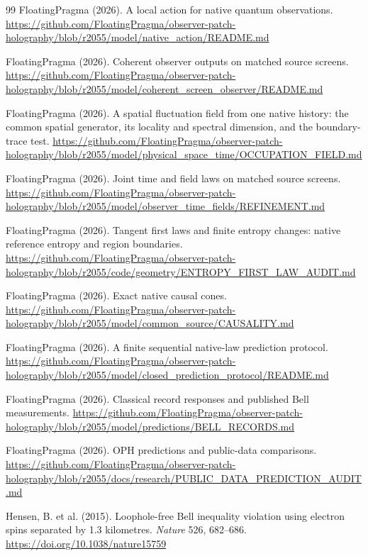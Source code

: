 \documentclass[11pt]{article}
\theoremstyle{definition}
\theoremstyle{remark}
\begin{document}
{\begin{thebibliography}{99}
FloatingPragma (2026). A local action for native quantum observations.
\url{https://github.com/FloatingPragma/observer-patch-holography/blob/r2055/model/native_action/README.md}

FloatingPragma (2026). Coherent observer outputs on matched source screens.
\url{https://github.com/FloatingPragma/observer-patch-holography/blob/r2055/model/coherent_screen_observer/README.md}

FloatingPragma (2026). A spatial fluctuation field from one native history:
the common spatial generator, its locality and spectral dimension, and the
boundary-trace test.
\url{https://github.com/FloatingPragma/observer-patch-holography/blob/r2055/model/physical_space_time/OCCUPATION_FIELD.md}

FloatingPragma (2026). Joint time and field laws on matched source screens.
\url{https://github.com/FloatingPragma/observer-patch-holography/blob/r2055/model/observer_time_fields/REFINEMENT.md}

FloatingPragma (2026). Tangent first laws and finite entropy changes:
native reference entropy and region boundaries.
\url{https://github.com/FloatingPragma/observer-patch-holography/blob/r2055/code/geometry/ENTROPY_FIRST_LAW_AUDIT.md}

FloatingPragma (2026). Exact native causal cones.
\url{https://github.com/FloatingPragma/observer-patch-holography/blob/r2055/model/common_source/CAUSALITY.md}

FloatingPragma (2026). A finite sequential native-law prediction protocol.
\url{https://github.com/FloatingPragma/observer-patch-holography/blob/r2055/model/closed_prediction_protocol/README.md}

FloatingPragma (2026). Classical record responses and published Bell
measurements.
\url{https://github.com/FloatingPragma/observer-patch-holography/blob/r2055/model/predictions/BELL_RECORDS.md}

FloatingPragma (2026). OPH predictions and public-data comparisons.
\url{https://github.com/FloatingPragma/observer-patch-holography/blob/r2055/docs/research/PUBLIC_DATA_PREDICTION_AUDIT.md}

Hensen, B. et al. (2015). Loophole-free Bell inequality violation using
electron spins separated by 1.3 kilometres. \emph{Nature} 526, 682--686.
\url{https://doi.org/10.1038/nature15759}


\end{thebibliography}}
\end{document}
